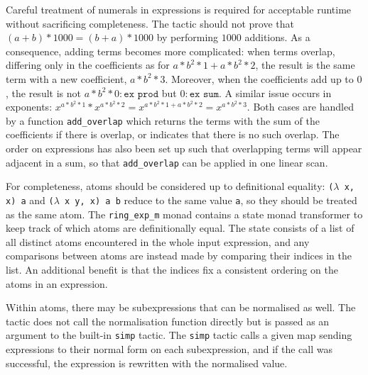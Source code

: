\documentclass{llncs}
\newcommand{\lean}[1]{\texttt{#1}\xspace} %
\newcommand{\ringexp}{\lean{ring\_exp}}
\begin{document}
Careful treatment of numerals in expressions is required for acceptable runtime without sacrificing completeness.
The tactic should not prove that $(a + b) * 1000 = (b + a) * 1000$ by performing $1000$ additions.
As a consequence, adding terms becomes more complicated:
when terms overlap, differing only in the coefficients as for $a * b^2 * 1 + a * b^2 * 2$,
the result is the same term with a new coefficient, $a * b^2 * 3$.
Moreover, when the coefficients add up to $0$, the result is not $a * b^2 * 0 : \lean{ex prod}$ but $0 : \lean{ex sum}$.
A similar issue occurs in exponents: $x ^ {a * b^2 * 1} * x ^ {a * b^2 * 2} = x ^ {a * b^2 * 1 + a * b^2 * 2} = x ^ {a * b^2 * 3}$.
Both cases are handled by a function \lean{add\_overlap} which returns the terms with the sum of the coefficients if there is overlap,
or indicates that there is no such overlap.
The order on expressions has also been set up such that overlapping terms will appear adjacent in a sum,
so that \lean{add\_overlap} can be applied in one linear scan.

For completeness, atoms should be considered up to definitional equality:
\lean{($\lambda$ x, x) a} and \lean{($\lambda$ x y, x) a b} reduce to the same value \lean{a},
so %
they should be treated as the same atom.
The \lean{ring\_exp\_m} monad contains a state monad transformer to keep track of which atoms are definitionally equal.
The state consists of a list of all distinct atoms encountered in the whole input expression,
and any comparisons between atoms are instead made by comparing their indices in the list.
An additional benefit is that the indices fix a consistent ordering on the atoms in an expression.

Within atoms, there may be subexpressions that can be normalised as well.
The tactic does not call the normalisation function directly
but is passed as an argument to the built-in \lean{simp} tactic.
The \lean{simp} tactic calls a given map sending expressions to their normal form on each subexpression,
and if the call was successful, the expression is rewritten with the normalised value.
\end{document}
